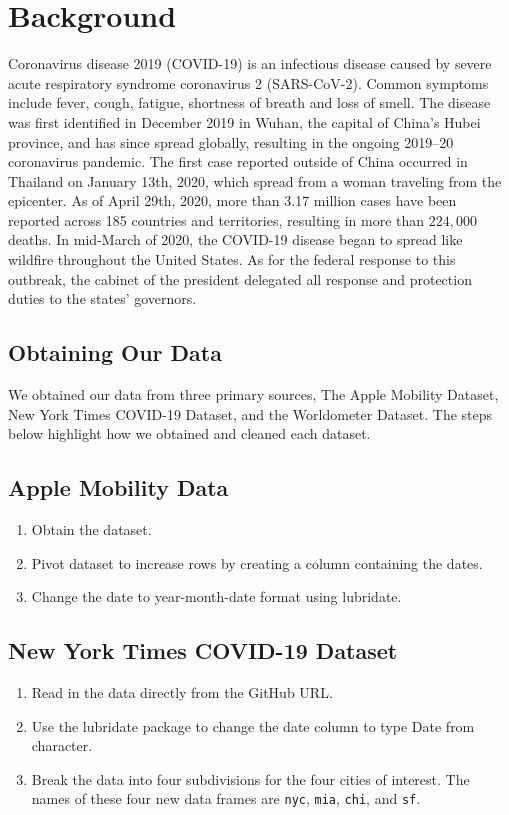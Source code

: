 \documentclass[11pt, english]{article}
\begin{document}
\section{Background}
Coronavirus disease 2019 (COVID-19) is an infectious disease caused by severe acute respiratory syndrome coronavirus 2 (SARS-CoV-2). Common symptoms include fever, cough, fatigue, shortness of breath and loss of smell. The disease was first identified in December 2019 in Wuhan, the capital of China's Hubei province, and has since spread globally, resulting in the ongoing 2019–20 coronavirus pandemic. The first case reported outside of China occurred in Thailand on January 13th, 2020, which spread from a woman traveling from the epicenter. As of April 29th, 2020, more than 3.17 million cases have been reported across 185 countries and territories, resulting in more than $224,000$ deaths. In mid-March of 2020, the COVID-19 disease began to spread like wildfire throughout the United States. As for the federal response to this outbreak, the cabinet of the president delegated all response and protection duties to the states’ governors. 
\subsection{Obtaining Our Data}
We obtained our data from three primary sources, The Apple Mobility Dataset\cite{apple}, New York Times COVID-19 Dataset\cite{NYT}, and the Worldometer Dataset\cite{worldometer}. The steps below highlight how we obtained and cleaned each dataset. 

\newpage
\subsection{Apple Mobility Data}
\begin{enumerate}
    \item Obtain the dataset.
    \item Pivot dataset to increase rows by creating a column containing the dates. 
    \item Change the date to year-month-date format using lubridate.
\end{enumerate}{}
\subsection{New York Times COVID-19 Dataset}
\begin{enumerate}
    \item Read in the data directly from the GitHub URL.
    \item Use the lubridate package to change the date column to type Date from character.
    \item Break the data into four subdivisions for the four cities of interest. The names of these four new data frames are \texttt{nyc}, \texttt{mia}, \texttt{chi}, and \texttt{sf}.
\end{enumerate}{}
\end{document}
